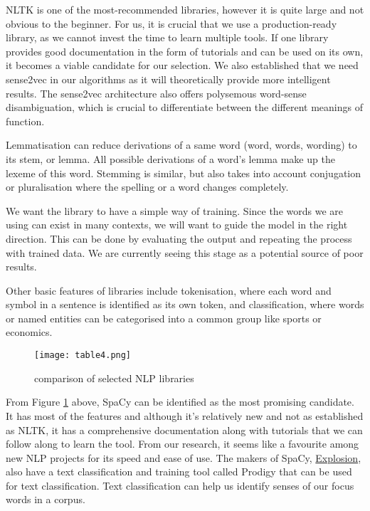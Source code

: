 \documentclass[12pt, usenames, dvipsnames]{report}
\begin{document}
\begin{flushleft}
NLTK is one of the most-recommended libraries, however it is quite large and not obvious to the beginner.
For us, it is crucial that we use a production-ready library, as we cannot invest the time to learn multiple tools.
If one library provides good documentation in the form of tutorials and can be used on its own, it becomes a viable candidate for our selection.
We also established that we need sense2vec in our algorithms as it will theoretically provide more intelligent results.
The sense2vec architecture also offers polysemous word-sense disambiguation, which is crucial to differentiate between the different meanings of function.

Lemmatisation can reduce derivations of a same word (word, words, wording) to its stem, or lemma.
All possible derivations of a word’s lemma make up the lexeme of this word.
Stemming is similar, but also takes into account conjugation or pluralisation where the spelling or a word changes completely.

We want the library to have a simple way of training.
Since the words we are using can exist in many contexts, we will want to guide the model in the right direction.
This can be done by evaluating the output and repeating the process with trained data.
We are currently seeing this stage as a potential source of poor results.

Other basic features of libraries include tokenisation, where each word and symbol in a sentence is identified as its own token, and classification, where words or named entities can be categorised into a common group like sports or economics.

\vspace*{1.2em}
\begin{figure}[!htbp]
  \hspace*{-3.666em}
  \texttt{[image: table4.png]}
  \caption{comparison of selected NLP libraries}
  \label{fig:table4}
\end{figure}
\vspace*{1.2em}

From Figure \ref{fig:table4} above, SpaCy can be identified as the most promising candidate.
It has most of the features and although it’s relatively new and not as established as NLTK, it has a comprehensive documentation along with tutorials that we can follow along to learn the tool.
From our research, it seems like a favourite among new NLP projects for its speed and ease of use.
The makers of SpaCy, \href{https://explosion.ai}{Explosion}, also have a text classification and training tool called Prodigy that can be used for text classification.
Text classification can help us identify senses of our focus words in a corpus.


\end{flushleft}
\end{document}
